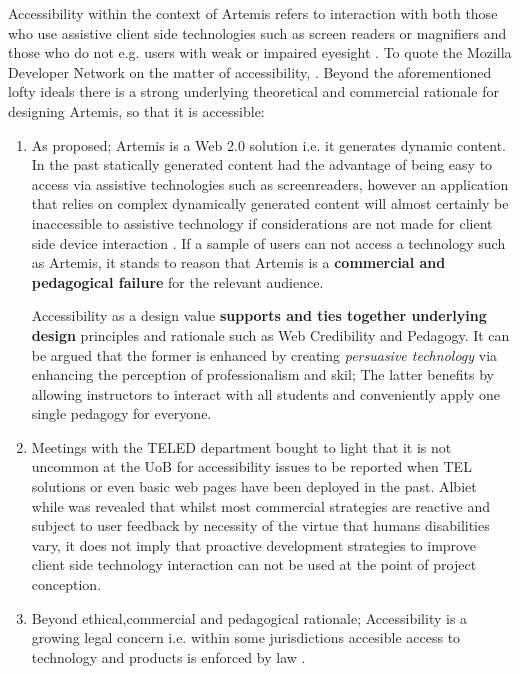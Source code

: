 Accessibility within the context of Artemis refers to interaction with both those who use assistive client side technologies such as screen readers or magnifiers \cite{MozillaDeveloperNetworka} and those who do not e.g. users with weak or impaired eyesight \cite{W3Cb}. To quote the Mozilla Developer Network on the matter of accessibility, . Beyond the aforementioned lofty ideal\textquotesingle s there is a strong underlying theoretical and commercial rationale for designing Artemis, so that it is accessible:

\begin{enumerate}

    \item As proposed; Artemis is a Web 2.0 solution i.e. it generates dynamic content. In the past statically generated content had the advantage of being easy to access via assistive technologies such as screenreaders, however an application that relies on complex dynamically generated content will almost certainly be inaccessible to assistive technology if considerations are not made for client side device interaction \cite{MozillaDeveloperNetwork}. If a sample of users can not access a technology such as Artemis, it stands to reason that Artemis is a \textbf{commercial and pedagogical failure} for the relevant audience.
    
    Accessibility as a design value \textbf{supports and ties together underlying design} principles and rationale such as Web Credibility and Pedagogy. It can be argued that the former is enhanced by creating \textit{persuasive technology} via enhancing the perception of professionalism and skil; The latter benefits by allowing instructors to interact with all students and conveniently apply one single pedagogy for everyone.
    
    \item Meetings with the TELED department bought to light that it is not uncommon at the UoB for accessibility issues to be reported when TEL solutions or even basic web pages have been deployed in the past. Albiet while was revealed that whilst most commercial strategies are reactive and subject to user feedback by necessity of the virtue that humans disabilities vary, it does not imply that proactive development strategies to improve client side technology interaction can not be used at the point of project conception\cite{W3C}.
    
    \item Beyond ethical,commercial and pedagogical rationale; Accessibility is a growing legal concern i.e. within some jurisdictions accesible access to technology and products is enforced by law  \cite{Network}.
    

    
\end{enumerate}

